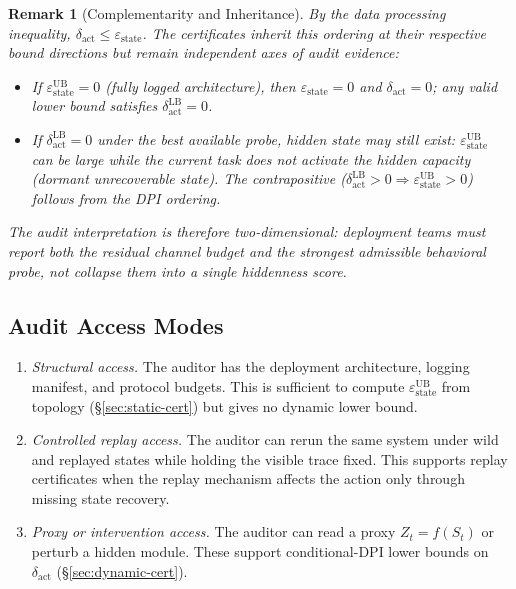 \documentclass{article}
\newtheorem{remark}{Remark}
\begin{document}
\begin{remark}[Complementarity and Inheritance]
\label{rem:complementarity}
By the data processing inequality, $\delta_\text{act} \leq \varepsilon_\text{state}$. The certificates inherit this ordering at their respective bound directions but remain independent axes of audit evidence:
\begin{itemize}
  \item If $\varepsilon_\text{state}^\text{UB} = 0$ (fully logged architecture), then $\varepsilon_\text{state} = 0$ and $\delta_\text{act} = 0$; any valid lower bound satisfies $\delta_\text{act}^\text{LB} = 0$.
  \item If $\delta_\text{act}^\text{LB} = 0$ under the best available probe, hidden state may still exist: $\varepsilon_\text{state}^\text{UB}$ can be large while the current task does not activate the hidden capacity (dormant unrecoverable state). The contrapositive ($\delta_\text{act}^\text{LB} > 0 \Rightarrow \varepsilon_\text{state}^\text{UB} > 0$) follows from the DPI ordering.
\end{itemize}
The audit interpretation is therefore two-dimensional: deployment teams must report both the residual channel budget and the strongest admissible behavioral probe, not collapse them into a single hiddenness score.
\end{remark}

\subsection{Audit Access Modes}

\begin{enumerate}
  \item \emph{Structural access.} The auditor has the deployment architecture, logging manifest, and protocol budgets. This is sufficient to compute $\varepsilon_\text{state}^\text{UB}$ from topology (\S\ref{sec:static-cert}) but gives no dynamic lower bound.

  \item \emph{Controlled replay access.} The auditor can rerun the same system under wild and replayed states while holding the visible trace fixed. This supports replay certificates when the replay mechanism affects the action only through missing state recovery.

  \item \emph{Proxy or intervention access.} The auditor can read a proxy $Z_t=f(S_t)$ or perturb a hidden module. These support conditional-DPI lower bounds on $\delta_\text{act}$ (\S\ref{sec:dynamic-cert}).
\end{enumerate}
\end{document}
